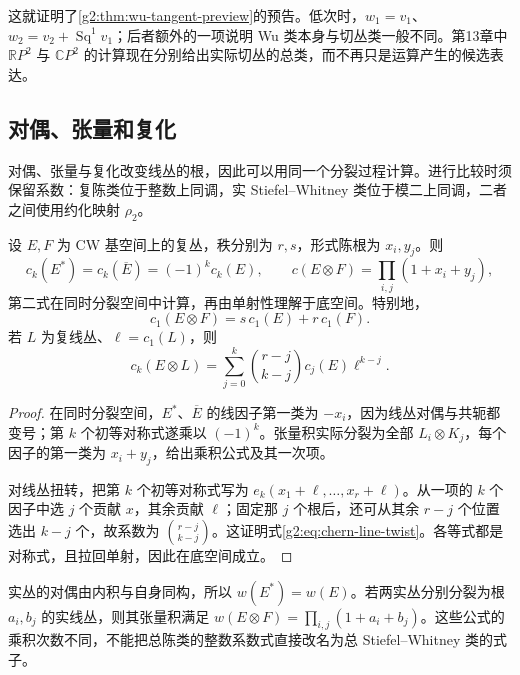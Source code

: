 这就证明了\cref{g2:thm:wu-tangent-preview}的预告。低次时，\(w_1=v_1\)、\(w_2=v_2+\operatorname{Sq}^1v_1\)；后者额外的一项说明 Wu 类本身与切丛类一般不同。第13章中 \(\mathbb RP^2\) 与 \(\mathbb CP^2\) 的计算现在分别给出实际切丛的总类，而不再只是运算产生的候选表达。

\subsection{对偶、张量和复化}
\label{g2:subsec:2103:04}
对偶、张量与复化改变线丛的根，因此可以用同一个分裂过程计算。进行比较时须保留系数：复陈类位于整数上同调，实 Stiefel--Whitney 类位于模二上同调，二者之间使用约化映射 \(\rho_2\)。

\begin{proposition}\label{g2:prop:chern-operations}
	设 \(E,F\) 为 CW 基空间上的复丛，秩分别为 \(r,s\)，形式陈根为 \(x_i,y_j\)。则
	\[
		c_k(E^*)=c_k(\overline E)=(-1)^k c_k(E),\qquad
		c(E\otimes F)=\prod_{i,j}(1+x_i+y_j),
	\]
	第二式在同时分裂空间中计算，再由单射性理解于底空间。特别地，
	\[
		c_1(E\otimes F)=s\,c_1(E)+r\,c_1(F).
	\]
	若 \(L\) 为复线丛、\(\ell=c_1(L)\)，则
	\begin{equation}\label{g2:eq:chern-line-twist}
		c_k(E\otimes L)=\sum_{j=0}^k\binom{r-j}{k-j}c_j(E)\ell^{k-j}.
	\end{equation}
\end{proposition}
\begin{proof}
	在同时分裂空间，\(E^*\)、\(\overline E\) 的线因子第一类为 \(-x_i\)，因为线丛对偶与共轭都变号；第 \(k\) 个初等对称式遂乘以 \((-1)^k\)。张量积实际分裂为全部 \(L_i\otimes K_j\)，每个因子的第一类为 \(x_i+y_j\)，给出乘积公式及其一次项。

	对线丛扭转，把第 \(k\) 个初等对称式写为 \(e_k(x_1+\ell,\ldots,x_r+\ell)\)。从一项的 \(k\) 个因子中选 \(j\) 个贡献 \(x\)，其余贡献 \(\ell\)；固定那 \(j\) 个根后，还可从其余 \(r-j\) 个位置选出 \(k-j\) 个，故系数为 \(\binom{r-j}{k-j}\)。这证明式\eqref{g2:eq:chern-line-twist}。各等式都是对称式，且拉回单射，因此在底空间成立。
\end{proof}

实丛的对偶由内积与自身同构，所以 \(w(E^*)=w(E)\)。若两实丛分别分裂为根 \(a_i,b_j\) 的实线丛，则其张量积满足 \(w(E\otimes F)=\prod_{i,j}(1+a_i+b_j)\)。这些公式的乘积次数不同，不能把总陈类的整数系数式直接改名为总 Stiefel--Whitney 类的式子。

